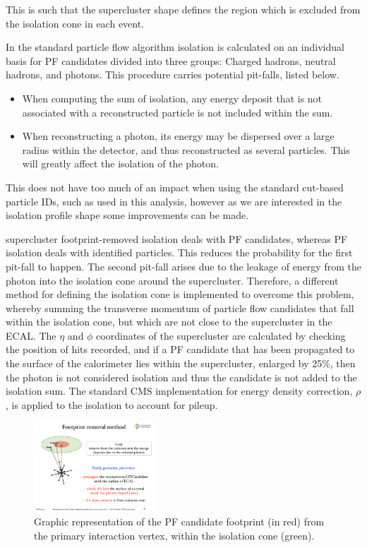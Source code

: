This is such that the supercluster shape defines the region which is excluded from the isolation cone in each event.

In the standard particle flow algorithm isolation is calculated on an individual basis for PF candidates divided into three groups: Charged hadrons, neutral hadrons, and photons. This procedure carries potential pit-falls, listed below.

\begin{itemize}
	\item When computing the sum of isolation, any energy deposit that is not associated with a reconstructed particle is not included within the sum.  
	\item When reconstructing a photon, its energy may be dispersed over a large radius within the detector, and thus reconstructed as several particles. This will greatly affect the isolation of the photon.
\end{itemize}

This does not have too much of an impact when using the standard cut-based particle IDs, such as used in this analysis, however as we are interested in the isolation profile shape some improvements can be made. 

supercluster footprint-removed isolation deals with PF candidates, whereas PF isolation deals with identified particles. This reduces the probability for the first pit-fall to happen. The second pit-fall arises due to the leakage of energy from the photon into the isolation cone around the supercluster. Therefore, a different method for defining the isolation cone is implemented to overcome this problem, whereby summing the transverse momentum of particle flow candidates that fall within the isolation cone, but which are not close to the supercluster in the ECAL. The $\eta$ and $\phi$ coordinates of the supercluster are calculated by checking the position of hits recorded, and if a PF candidate that has been propagated to the surface of the calorimeter lies within the supercluster, enlarged by 25\%, then the photon is not considered isolation and thus the candidate is not added to the isolation sum. The standard CMS implementation for energy density correction, $\rho$, is applied to the isolation to account for pileup. 

\begin{figure} 
\begin{center}
\includegraphics[width=0.4\textwidth]{Figures/RandomCone3.pdf}
\end{center}
\caption{Graphic representation of the PF candidate footprint (in red) from the primary interaction vertex, within the isolation cone (green). \cite{MarcoThesis}}
\label{fig-SCFR}
\end{figure}

